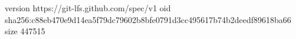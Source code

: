 version https://git-lfs.github.com/spec/v1
oid sha256:c88eb470e9d14ea5f79dc79602b8bfe0791d3cc495617b74b2deedf89618ba66
size 447515
